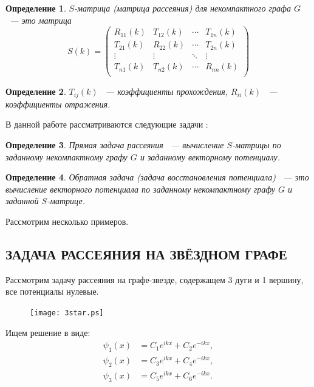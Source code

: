 \documentclass[a4 paper, 12 pt]{extarticle}
\newtheorem{Def}{Определение}[section]
\begin{document}
  \begin{Def}
	$S$-матрица (матрица рассеяния) для некомпактного графа $G$ ~--- это матрица
	\[
	S(k)=
	\begin{pmatrix}
	R_{11}(k) & T_{12}(k) & \cdots & T_{1n}(k) \\
	T_{21}(k) & R_{22}(k) & \cdots & T_{2n}(k) \\
	\vdots    & \vdots & \ddots    & \vdots \\
	T_{n1}(k) & T_{n2}(k) & \cdots & R_{nn}(k) \\
	\end{pmatrix}
	\]
  \end{Def}

  \begin{Def}
	$T_{ij}\left(k\right)$ ~--- коэффициенты прохождения, 
	$R_{ii}\left(k\right)$ ~--- коэффициенты отражения.
  \end{Def}
  
  В данной работе рассматриваются следующие задачи \cite{GerasimenkoPavlov}:
  \begin{Def}
  	Прямая задача рассеяния ~--- вычисление $S$-матрицы по заданному некомпактному графу $G$ и заданному векторному потенциалу.
  \end{Def}

  \begin{Def}
  	Обратная задача (задача восстановления потенциала) ~--- это вычисление векторного потенциала по заданному некомпактному графу $G$ и заданной $S$-матрице.
  \end{Def}
 
  Рассмотрим несколько примеров.
  
  \subsection{ЗАДАЧА РАССЕЯНИЯ НА ЗВЁЗДНОМ ГРАФЕ}
  Рассмотрим задачу рассеяния на графе-звезде, содержащем 3 дуги и 1 вершину, все потенциалы нулевые.
  \begin{figure}[!htb]
  	\centering
   	\texttt{[image: 3star.ps]}
  \end{figure}
  Ищем решение в виде:
  \[\begin{split}
  \psi_1\left(x\right) &= C_1 e^{ikx} + C_2 e^{-ikx}, \\
  \psi_2\left(x\right) &= C_3 e^{ikx} + C_4 e^{-ikx}, \\
  \psi_3\left(x\right) &= C_5 e^{ikx} + C_6 e^{-ikx}.
  \end{split}\]
  
\end{document}

